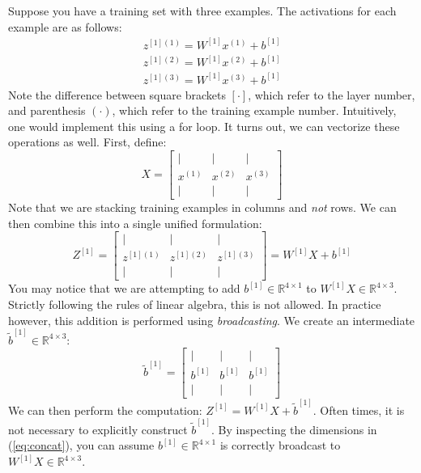 \documentclass{article}
\numberwithin{equation}{section}
\begin{document}
Suppose you have a training set with three examples. The activations for each example are as follows:
\begin{align*}
z^{[1](1)} = W^{[1]} x^{(1)} + b^{[1]} \\
z^{[1](2)} = W^{[1]} x^{(2)} + b^{[1]} \\
z^{[1](3)} = W^{[1]} x^{(3)} + b^{[1]}
\end{align*}
Note the difference between square brackets $[\cdot]$, which refer to the layer number, and parenthesis $(\cdot)$, which refer to the training example number. Intuitively, one would implement this using a for loop. It turns out, we can vectorize these operations as well. First, define:
\begin{equation}
X = \left[\begin{array}{ccc}
| & | & | \\
x^{(1)} & x^{(2)} & x^{(3)} \\
| & | & |
\end{array} \right]
\end{equation}
Note that we are stacking training examples in columns and \textit{not} rows. We can then combine this into a single unified formulation:
\begin{equation}\label{eq:concat}
Z^{[1]} = \left[\begin{array}{ccc}
| & | & | \\
z^{[1](1)} & z^{[1](2)} & z^{[1](3)} \\
| & | & |
\end{array} \right] = W^{[1]} X + b^{[1]}
\end{equation}
You may notice that we are attempting to add $b^{[1]} \in \mathbb{R}^{4 \times 1}$ to $W^{[1]} X \in \mathbb{R}^{4 \times 3}$. Strictly following the rules of linear algebra, this is not allowed.
In practice however, this addition is performed using \textit{broadcasting}.
We create an intermediate $\tilde{b}^{[1]} \in \mathbb{R}^{4 \times 3}$:
\begin{equation}
\tilde{b}^{[1]} = \left[\begin{array}{ccc}
| & | & | \\
b^{[1]} & b^{[1]} & b^{[1]} \\
| & | & |
\end{array} \right]
\end{equation}
We can then perform the computation: $Z^{[1]}  = W^{[1]} X + \tilde{b}^{[1]}$.
Often times, it is not necessary to explicitly construct $\tilde{b}^{[1]}$. By inspecting the dimensions in (\ref{eq:concat}), you can assume $b^{[1]} \in \mathbb{R}^{4 \times 1}$ is correctly broadcast to $W^{[1]} X \in \mathbb{R}^{4 \times 3}$.
\end{document}
